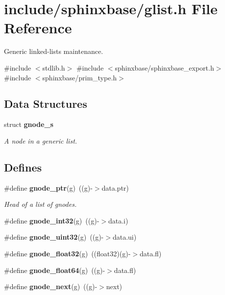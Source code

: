 \section{include/sphinxbase/glist.h \-File \-Reference}
\label{glist_8h}


\-Generic linked-\/lists maintenance.  


{\ttfamily \#include $<$stdlib.\-h$>$}\*
{\ttfamily \#include $<$sphinxbase/sphinxbase\-\_\-export.\-h$>$}\*
{\ttfamily \#include $<$sphinxbase/prim\-\_\-type.\-h$>$}\*
\subsection*{\-Data \-Structures}
\begin{DoxyCompactItemize}
\item 
struct {\bf gnode\-\_\-s}
\begin{DoxyCompactList}\small\item\em \-A node in a generic list. \end{DoxyCompactList}\end{DoxyCompactItemize}
\subsection*{\-Defines}
\begin{DoxyCompactItemize}
\item 
\#define {\bf gnode\-\_\-ptr}(g)~((g)-\/$>$data.\-ptr)
\begin{DoxyCompactList}\small\item\em \-Head of a list of gnodes. \end{DoxyCompactList}\item 
\#define {\bfseries gnode\-\_\-int32}(g)~((g)-\/$>$data.\-i)\label{glist_8h_a7daab0205c40d1b449529ee4cc54522b}

\item 
\#define {\bfseries gnode\-\_\-uint32}(g)~((g)-\/$>$data.\-ui)\label{glist_8h_a3af0cc8d5d612e85fa433ac3edf42fd6}

\item 
\#define {\bfseries gnode\-\_\-float32}(g)~((float32)(g)-\/$>$data.\-fl)\label{glist_8h_aaf6a2bdc69642303426c20fc0bdfa5f6}

\item 
\#define {\bfseries gnode\-\_\-float64}(g)~((g)-\/$>$data.\-fl)\label{glist_8h_abfea8eee77afc1e3046ef33ae6c0f5b4}

\item 
\#define {\bfseries gnode\-\_\-next}(g)~((g)-\/$>$next)\label{glist_8h_a33fc794db097ba2a5a36eba12c418993}

\end{DoxyCompactItemize}
